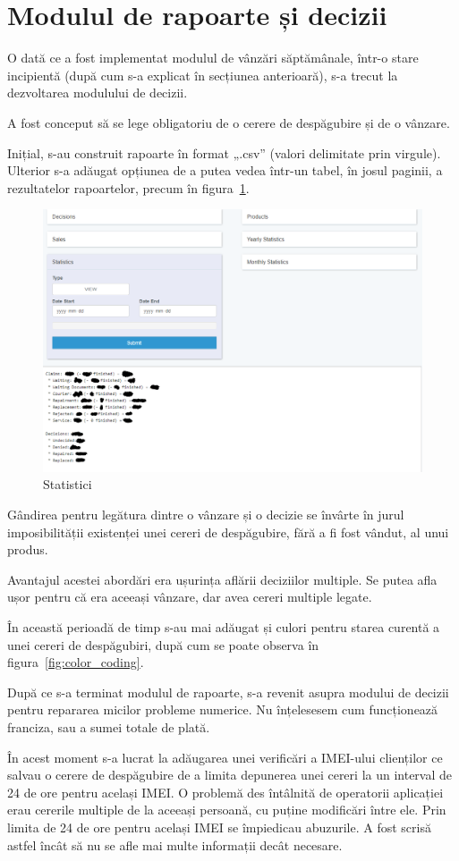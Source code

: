 \section{Modulul de rapoarte și decizii}

	O dată ce a fost implementat modulul de vânzări săptămânale, într-o stare incipientă (după cum s-a explicat în secțiunea anterioară), s-a trecut la dezvoltarea modulului de decizii.

	A fost conceput să se lege obligatoriu de o cerere de despăgubire și de o vânzare.

	Inițial, s-au construit rapoarte în format „.csv” (valori delimitate prin virgule).
	Ulterior s-a adăugat opțiunea de a putea vedea într-un tabel, în josul paginii, a rezultatelor rapoartelor, precum în figura~\ref{fig:statistics}.

	\begin{figure}
		\includegraphics[width=\linewidth]{../imagini/statistics.png}
		\caption{Statistici}
		\label{fig:statistics}
	\end{figure}


	Gândirea pentru legătura dintre o vânzare și o decizie se învârte în jurul imposibilității existenței unei cereri de despăgubire, fără a fi fost vândut, al unui produs.

	Avantajul acestei abordări era ușurința aflării deciziilor multiple.
	Se putea afla ușor pentru că era aceeași vânzare, dar avea cereri multiple legate.

	În această perioadă de timp s-au mai adăugat și culori pentru starea curentă a unei cereri de despăgubiri, după cum se poate observa în figura~\ref{fig:color_coding}.

	După ce s-a terminat modulul de rapoarte, s-a revenit asupra modului de decizii pentru repararea micilor probleme numerice.
	Nu înțelesesem cum funcționează franciza, sau a sumei totale de plată.

	În acest moment s-a lucrat la adăugarea unei verificări a IMEI-ului clienților ce salvau o cerere de despăgubire de a limita depunerea unei cereri la un interval de 24 de ore pentru același IMEI.
	O problemă des întâlnită de operatorii aplicației erau cererile multiple de la aceeași persoană, cu puține modificări între ele.
	Prin limita de 24 de ore pentru același IMEI se împiedicau abuzurile.
	A fost scrisă astfel încât să nu se afle mai multe informații decât necesare.
